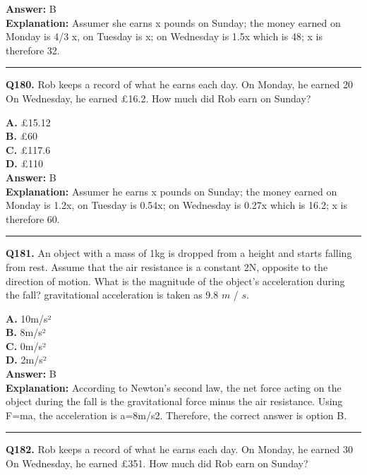 \documentclass[12pt]{article}
\begin{document}
\textbf{Answer:} B \\
\textbf{Explanation:} Assumer she earns x pounds on Sunday; the money earned on Monday is 4/3 x, on Tuesday is x; on Wednesday is 1.5x which is 48; x is therefore 32.

\hrule
\vspace{1em}


\noindent
\textbf{Q180.} Rob keeps a record of what he earns each day.
On Monday, he earned 20%
On Wednesday, he earned £16.2. How much did Rob earn on Sunday?



\textbf{A.} £15.12 \\
\textbf{B.} £60 \\
\textbf{C.} £117.6 \\
\textbf{D.} £110 \\

\textbf{Answer:} B \\
\textbf{Explanation:} Assumer he earns x pounds on Sunday; the money earned on Monday is 1.2x, on Tuesday is 0.54x; on Wednesday is 0.27x which is 16.2; x is therefore 60.

\hrule
\vspace{1em}


\noindent
\textbf{Q181.} An object with a mass of 1kg is dropped from a height and starts falling from rest. Assume that the air resistance is a constant 2N, opposite to the direction of motion. What is the magnitude of the object's acceleration during the fall? gravitational acceleration is taken as 9.8
$𝑚$
/
$𝑠$.



\textbf{A.} 10m/s² \\
\textbf{B.} 8m/s² \\
\textbf{C.} 0m/s² \\
\textbf{D.} 2m/s² \\

\textbf{Answer:} B \\
\textbf{Explanation:} According to Newton's second law, the net force acting on the object during the fall is the gravitational force minus the air resistance. Using F=ma, the acceleration is a=8m/s2. Therefore, the correct answer is option B.

\hrule
\vspace{1em}


\noindent
\textbf{Q182.} Rob keeps a record of what he earns each day.
On Monday, he earned 30%
On Wednesday, he earned £351. How much did Rob earn on Sunday?
\end{document}
